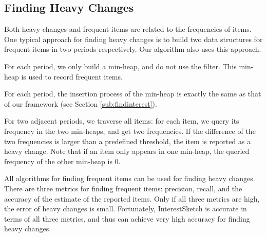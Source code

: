 \presub
\subsection{Finding Heavy Changes}
\postsub

Both heavy changes and frequent items are related to the frequencies of items.
%
One typical approach for finding heavy changes is to build two data structures for frequent items in two periods respectively.
%
Our algorithm also uses this approach.
%


For each period, we only build a min-heap, and do not use the filter. This min-heap is used to record frequent items.

{
\color{reviewD}
 For each period,
the insertion process of the min-heap is exactly the same as that of our framework (see Section \ref{sub:findinterest}).
}


 For two adjacent periods, we traverse all items: for each item, we query its frequency in the two min-heaps, and get two frequencies. If the difference of the two frequencies is larger than a predefined threshold, the item is reported as a heavy change. Note that if an item only appears in one min-heap, the queried frequency of the other min-heap is 0.

All algorithms for finding frequent items can be used for finding heavy changes.
%
There are three metrics for finding frequent items: precision, recall, and the accuracy of the estimate of the reported items.
Only if all three metrics are high, the error of heavy changes is small. Fortunately, InterestSketch is accurate in terms of all three metrics, and thus can achieve very high accuracy for finding heavy changes.
%







